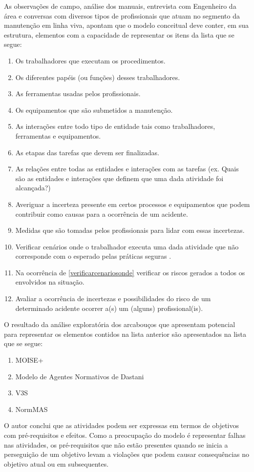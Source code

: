 As observações de campo, análise dos manuais, entrevista com Engenheiro da área e conversas com diversos tipos de profissionais que atuam no segmento da manutenção em linha viva, apontam que o modelo conceitual deve conter, em sua estrutura, elementos com a capacidade de representar os itens da lista que se segue:

\begin{enumerate}
	\item Os trabalhadores que executam os procedimentos.
	\item Os diferentes papéis (ou funções) desses trabalhadores.
	\item As ferramentas usadas pelos profissionais.
	\item Os equipamentos que são submetidos a manutenção.
	\item As interações entre todo tipo de entidade tais como trabalhadores, ferramentas e equipamentos.
	\item As etapas das tarefas que devem ser finalizadas. 
	\item As relações entre todas as entidades e interações com as tarefas (ex. Quais são as entidades e interações que definem que uma dada atividade foi alcançada?)
	\item Averiguar a incerteza presente em certos processos e equipamentos que podem contribuir como causas para a ocorrência de um acidente.
	\item Medidas que são tomadas pelos profissionais para lidar com essas incertezas.
	\item Verificar cenários onde o trabalhador executa uma dada atividade que não corresponde com o esperado pelas práticas seguras \label{verificarcenariosonde}. 
	\item Na ocorrência de \ref{verificarcenariosonde} verificar os riscos gerados a todos os envolvidos na situação.
	\item Avaliar a ocorrência de incertezas e possibilidades do risco de um determinado acidente ocorrer a(s) um (alguns) profissional(is).
\end{enumerate}

O resultado da análise exploratória dos arcabouços que apresentam potencial para representar os elementos contidos na lista anterior são apresentados na lista que se segue:

\begin{enumerate}
	\item MOISE+ \cite{moiseframeworktwo}
	\item Modelo de Agentes Normativos de Dastani \cite{dastaniframework}
	\item V3S \cite{v3sframework} 
	\item NormMAS \cite{normas}
\end{enumerate}

O autor conclui que as atividades podem ser expressas em termos de objetivos com pré-requisitos e efeitos. Como a preocupação do modelo é representar falhas nas atividades, os pré-requisitos que não estão presentes quando se inicia a perseguição de um objetivo levam a violações que podem causar consequências no objetivo atual ou em subsequentes.